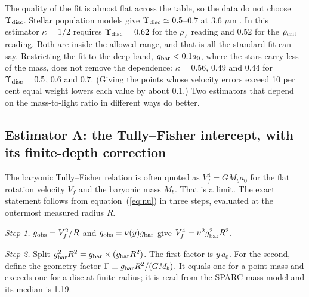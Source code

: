 \documentclass[fleqn,usenatbib]{mnras}
\begin{document}
The quality of the fit is almost flat across the table, so the data do not choose $\Upsilon_{\rm disc}$. Stellar population models give $\Upsilon_{\rm disc}\simeq0.5$--$0.7$ at 3.6 $\mu$m \citep{Meidt2014,Schombert2019}. In this estimator $\kappa=1/2$ requires $\Upsilon_{\rm disc}=0.62$ for the $\rho_\Lambda$ reading and $0.52$ for the $\rho_{\rm crit}$ reading. Both are inside the allowed range, and that is all the standard fit can say. Restricting the fit to the deep band, $g_{\rm bar}<0.1a_0$, where the stars carry less of the mass, does not remove the dependence: $\kappa=0.56$, $0.49$ and $0.44$ for $\Upsilon_{\rm disc}=0.5$, $0.6$ and $0.7$. (Giving the points whose velocity errors exceed 10 per cent equal weight lowers each value by about 0.1.) Two estimators that depend on the mass-to-light ratio in different ways do better.

\subsection{Estimator A: the Tully--Fisher intercept, with its finite-depth correction}
\label{sec:btfr}
The baryonic Tully--Fisher relation is often quoted as $V_f^4=GM_ba_0$ for the flat rotation velocity $V_f$ and the baryonic mass $M_b$. That is a limit. The exact statement follows from equation~(\ref{eq:nu}) in three steps, evaluated at the outermost measured radius $R$.

\emph{Step 1.} $g_{\rm obs}=V_f^2/R$ and $g_{\rm obs}=\nu(y)g_{\rm bar}$ give $V_f^4=\nu^2g_{\rm bar}^2R^2$.

\emph{Step 2.} Split $g_{\rm bar}^2R^2=g_{\rm bar}\times(g_{\rm bar}R^2)$. The first factor is $y\,a_0$. For the second, define the geometry factor $\Gamma\equiv g_{\rm bar}R^2/(GM_b)$. It equals one for a point mass and exceeds one for a disc at finite radius; it is read from the SPARC mass model and its median is 1.19.
\end{document}
